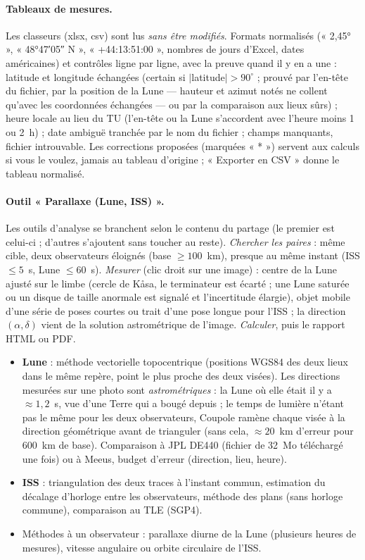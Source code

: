 \paragraph{Tableaux de mesures.} Les classeurs (xlsx, csv) sont lus \emph{sans être modifiés}. Formats normalisés
(« 2,45° », « 48°47′05″ N », « +44:13:51:00 », nombres de jours d'Excel, dates américaines) et contrôles ligne par
ligne, avec la preuve quand il y en a une : latitude et longitude échangées (certain si $|$latitude$| > 90^\circ$ ;
prouvé par l'en-tête du fichier, par la position de la Lune — hauteur et azimut notés ne collent qu'avec les
coordonnées échangées — ou par la comparaison aux lieux sûrs) ; heure locale au lieu du TU (l'en-tête ou la Lune
s'accordent avec l'heure moins 1 ou 2~h) ; date ambiguë tranchée par le nom du fichier ; champs manquants, fichier
introuvable. Les corrections proposées (marquées « * ») servent aux calculs si vous le voulez, jamais au tableau
d'origine ; « Exporter en CSV » donne le tableau normalisé.

\paragraph{Outil « Parallaxe (Lune, ISS) ».} Les outils d'analyse se branchent selon le contenu du partage (le
premier est celui-ci ; d'autres s'ajoutent sans toucher au reste). \emph{Chercher les paires} : même cible, deux
observateurs éloignés (base $\ge 100$~km), presque au même instant (ISS $\le 5$~s, Lune $\le 60$~s). \emph{Mesurer}
(clic droit sur une image) : centre de la Lune ajusté sur le limbe (cercle de Kåsa, le terminateur est écarté ; une
Lune saturée ou un disque de taille anormale est signalé et l'incertitude élargie), objet mobile d'une série de poses
courtes ou trait d'une pose longue pour l'ISS ; la direction $(\alpha, \delta)$ vient de la solution astrométrique de
l'image. \emph{Calculer}, puis le rapport HTML ou PDF.
\begin{itemize}
\item \textbf{Lune} : méthode vectorielle topocentrique (positions WGS84 des deux lieux dans le même repère, point le
plus proche des deux visées). Les directions mesurées sur une photo sont \emph{astrométriques} : la Lune où elle était
il y a $\approx 1{,}2$~s, vue d'une Terre qui a bougé depuis ; le temps de lumière n'étant pas le même pour les deux
observateurs, Coupole ramène chaque visée à la direction géométrique avant de trianguler (sans cela, $\approx 20$~km
d'erreur pour 600~km de base). Comparaison à JPL DE440 (fichier de 32~Mo téléchargé une fois) ou à Meeus, budget
d'erreur (direction, lieu, heure).
\item \textbf{ISS} : triangulation des deux traces à l'instant commun, estimation du décalage d'horloge entre les
observateurs, méthode des plans (sans horloge commune), comparaison au TLE (SGP4).
\item Méthodes à un observateur : parallaxe diurne de la Lune (plusieurs heures de mesures), vitesse angulaire ou
orbite circulaire de l'ISS.
\end{itemize}

